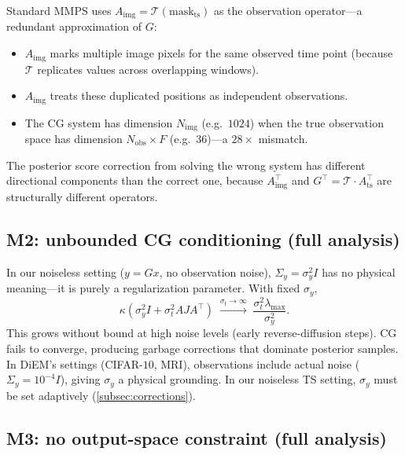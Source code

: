 \documentclass{article}
\theoremstyle{plain}
\theoremstyle{definition}
\theoremstyle{remark}
\newcommand{\tsimg}{\mathcal{T}}
\newcommand{\Nimg}{N_{\mathrm{img}}}
\newcommand{\Nobs}{N_{\mathrm{obs}}}
\newcommand{\Ats}{A_{\mathrm{ts}}}
\newcommand{\Aimg}{A_{\mathrm{img}}}
\begin{document}
Standard MMPS uses $\Aimg = \tsimg(\mathrm{mask}_{\mathrm{ts}})$ as the observation operator---a redundant approximation of $G$:
\begin{itemize}
\setlength{\itemsep}{0pt}
\item $\Aimg$ marks multiple image pixels for the same observed time point (because $\tsimg$ replicates values across overlapping windows).
\item $\Aimg$ treats these duplicated positions as independent observations.
\item The CG system has dimension $\Nimg$ (e.g.\ $1024$) when the true observation space has dimension $\Nobs \times F$ (e.g.\ $36$)---a $28\times$ mismatch.
\end{itemize}
The posterior score correction from solving the wrong system has different directional components than the correct one, because $\Aimg^\top$ and $G^\top = \tsimg \cdot \Ats^\top$ are structurally different operators.

\subsection{M2: unbounded CG conditioning (full analysis)}
\label{app:M2}

In our noiseless setting ($y = Gx$, no observation noise), $\Sigma_y = \sigma_y^2 I$ has no physical meaning---it is purely a regularization parameter. With fixed $\sigma_y$,
$$
\kappa(\sigma_y^2 I + \sigma_t^2 A J A^\top) \;\xrightarrow{\sigma_t \to \infty}\; \frac{\sigma_t^2 \lambda_{\max}}{\sigma_y^2}.
$$
This grows without bound at high noise levels (early reverse-diffusion steps). CG fails to converge, producing garbage corrections that dominate posterior samples. In DiEM's settings (CIFAR-$10$, MRI), observations include actual noise ($\Sigma_y = 10^{-4} I$), giving $\sigma_y$ a physical grounding. In our noiseless TS setting, $\sigma_y$ must be set adaptively (\cref{subsec:corrections}).

\subsection{M3: no output-space constraint (full analysis)}
\label{app:M3}
\end{document}
